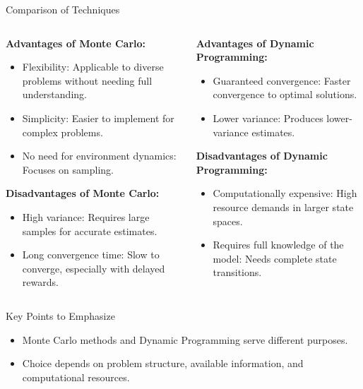 \documentclass[aspectratio=169]{beamer}
\begin{document}
\begin{frame}{Comparison of Techniques}
    \begin{columns}
        \begin{column}{0.5\textwidth}
            \textbf{Advantages of Monte Carlo:}
            \begin{itemize}
                \item Flexibility: Applicable to diverse problems without needing full understanding.
                \item Simplicity: Easier to implement for complex problems.
                \item No need for environment dynamics: Focuses on sampling.
            \end{itemize}

            \textbf{Disadvantages of Monte Carlo:}
            \begin{itemize}
                \item High variance: Requires large samples for accurate estimates.
                \item Long convergence time: Slow to converge, especially with delayed rewards.
            \end{itemize}
        \end{column}

        \begin{column}{0.5\textwidth}
            \textbf{Advantages of Dynamic Programming:}
            \begin{itemize}
                \item Guaranteed convergence: Faster convergence to optimal solutions.
                \item Lower variance: Produces lower-variance estimates.
            \end{itemize}

            \textbf{Disadvantages of Dynamic Programming:}
            \begin{itemize}
                \item Computationally expensive: High resource demands in larger state spaces.
                \item Requires full knowledge of the model: Needs complete state transitions.
            \end{itemize}
        \end{column}
    \end{columns}
\end{frame}

\begin{frame}{Key Points to Emphasize}
    \begin{itemize}
        \item Monte Carlo methods and Dynamic Programming serve different purposes.
        \item Choice depends on problem structure, available information, and computational resources.
    \end{itemize}
\end{frame}
\end{document}
